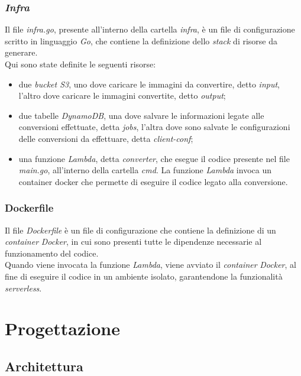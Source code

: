 \subsubsection*{\emph{Infra}}

Il file \emph{infra.go}, presente all'interno della cartella \emph{infra}, è un file di configurazione scritto in linguaggio
\emph{Go}, che contiene la definizione dello \emph{stack} di risorse da
generare.\\
Qui sono state definite le seguenti risorse:
\begin{itemize}
      \item due \emph{bucket S3}, uno dove caricare le immagini da convertire,
            detto \emph{input}, l'altro dove caricare le immagini convertite, detto
            \emph{output};
      \item due tabelle \emph{DynamoDB}, una dove salvare le informazioni legate
            alle conversioni effettuate, detta \emph{jobs}, l'altra dove sono salvate le
            configurazioni delle conversioni da effettuare, detta \emph{client-conf};
      \item una funzione \emph{Lambda}, detta \emph{converter}, che esegue il
            codice presente nel file \emph{main.go}, all'interno della cartella
            \emph{cmd}. La funzione \emph{Lambda} invoca un \glsfirstoccur\gls{container}
            \glsfirstoccur\gls{docker} che permette di eseguire il codice legato
            alla conversione.
\end{itemize}

\subsubsection*{Dockerfile}

Il file \emph{Dockerfile} è un file di configurazione che contiene la
definizione di un \emph{container} \emph{Docker}, in cui sono presenti tutte le
dipendenze necessarie al funzionamento del codice. \\
Quando viene invocata la funzione \emph{Lambda}, viene avviato il
\emph{container} \emph{Docker}, al fine di eseguire il codice in un ambiente
isolato, garantendone la funzionalità \emph{serverless}.

\section{Progettazione}

\subsection{Architettura}

